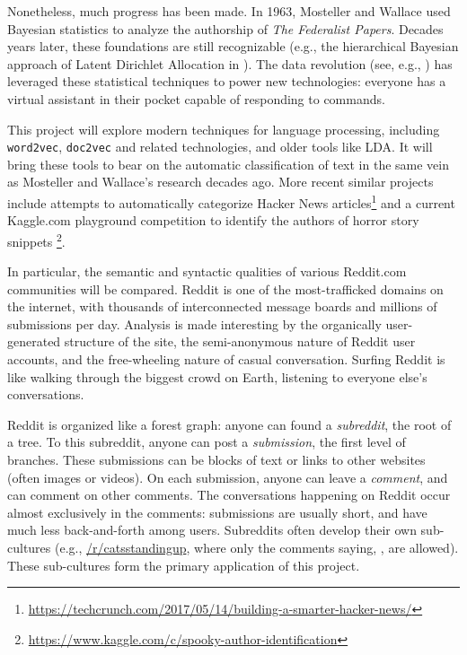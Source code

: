 \documentclass[]{article}
\begin{document}
Nonetheless, much progress has been made. In 1963, Mosteller and Wallace used Bayesian statistics to analyze the authorship of \emph{The Federalist Papers}\autocite{Mosteller1963}. Decades years later, these foundations are still recognizable (e.g., the hierarchical Bayesian approach of Latent Dirichlet Allocation in \cite{Blei2003}). The data revolution (see, e.g., \cite{fourthparadigm}) has leveraged these statistical techniques to power new technologies: everyone has a virtual assistant in their pocket capable of responding to commands.

This project will explore modern techniques for language processing, including \texttt{word2vec}, \texttt{doc2vec} and related technologies, and older tools like LDA. It will bring these tools to bear on the automatic classification of text in the same vein as Mosteller and Wallace's research decades ago. More recent similar projects include attempts to automatically categorize Hacker News articles\footnote{\url{https://techcrunch.com/2017/05/14/building-a-smarter-hacker-news/}} and a current Kaggle.com playground competition to identify the authors of horror story snippets \footnote{\url{https://www.kaggle.com/c/spooky-author-identification}}.

In particular, the semantic and syntactic qualities of various Reddit.com communities will be compared. Reddit is one of the most-trafficked domains on the internet, with thousands of interconnected message boards and millions of submissions per day\cite{redditblog:2015}. Analysis is made interesting by the organically user-generated structure of the site, the semi-anonymous nature of Reddit user accounts, and the free-wheeling nature of casual conversation. Surfing Reddit is like walking through the biggest crowd on Earth, listening to everyone else's conversations.

Reddit is organized like a forest graph: anyone can found a \emph{subreddit}, the root of a tree. To this subreddit, anyone can post a \emph{submission}, the first level of branches. These submissions can be blocks of text or links to other websites (often images or videos). On each submission, anyone can leave a \emph{comment}, and can comment on other comments. The conversations happening on Reddit occur almost exclusively in the comments: submissions are usually short, and have much less back-and-forth among users. Subreddits often develop their own sub-cultures (e.g., \href{https://reddit.com/r/catsstandingup}{/r/catsstandingup}, where only the comments saying, , are allowed). These sub-cultures form the primary application of this project.
\end{document}

